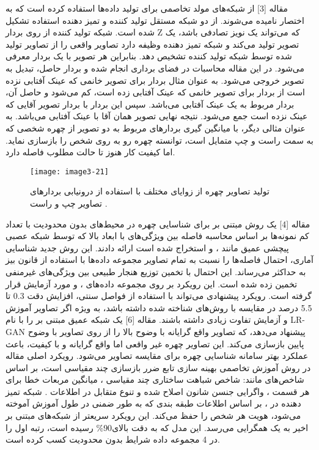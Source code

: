 مقاله [3] از شبکه‌های مولد تخاصمی برای تولید داده‌ها استفاده کرده است که به اختصار  نامیده می‌شوند.  از دو شبکه مستقل تولید کننده و تمیز دهنده استفاده تشکیل شده است. شبکه تولید کننده از روی بردار Z که می‌تواند یک نویز تصادفی باشد، یک تصویر تولید می‌کند و شبکه تمیز دهنده وظیفه دارد تصاویر واقعی را از تصاویر تولید شده توسط شبکه تولید کننده تشخیص دهد. بنابراین هر تصویر با یک بردار  معرفی می‌شود. در این مقاله محاسبات در فضای برداری انجام شده و بردار حاصل، تبدیل به تصویر خروجی می‌شود. به عنوان مثال بردار  برای تصویر خانمی که عینک آفتابی نزده است از بردار  برای تصویر خانمی که عینک آفتابی زده است، کم می‌شود و حاصل آن، بردار مربوط به یک عینک آفتابی می‌باشد. سپس این بردار با بردار تصویر آقایی که عینک نزده است جمع می‌شود. نتیجه نهایی تصویر همان آقا با عینک آفتابی می‌باشد. به عنوان مثالی دیگر، با میانگین گیری بردارهای مربوط به دو تصویر از چهره شخصی که به سمت راست و چپ متمایل است، توانسته چهره رو به روی شخص را بازسازی نماید. اما کیفیت کار هنوز تا حالت مطلوب فاصله دارد.
 \begin{figure}[h]
\centering
  \texttt{[image: image3-21]}
  \caption{تولید تصاویر چهره از زوایای مختلف با استفاده از درونیابی بردارهای تصاویر چپ و راست \cite{ref1}.}
  \label{image3-21}
\end{figure}
\noindent
مقاله [4] یک روش مبتنی بر  برای شناسایی چهره در محیط‌های بدون محدودیت با تعداد کم نمونه‌ها بر اساس محاسبه فاصله بین ویژگی‌های با ابعاد بالا که توسط شبکه عصبی پیچشی عمیق مانند
،
و
استخراج شده است ارائه دادند. این روش جدید شناسایی آماری، احتمال فاصله‌ها را نسبت به تمام تصاویر مجموعه داده‌ها با استفاده از قانون بیز  به حداکثر می‌رساند. این احتمال با تخمین توزیع هنجار طبیعی  بین ویژگی‌های غیرمنفی تخمین زده شده است. این رویکرد بر روی مجموعه داده‌های
،
و
 مورد آزمایش قرار گرفته است. رویکرد پیشنهادی می‌تواند با استفاده از فواصل سنتی، افزایش دقت 0.3 تا 5.5 درصد در مقایسه با روش‌های شناخته شده داشته باشد، به ویژه اگر تصاویر آموزش و آزمایش تفاوت زیادی داشته باشند. 
\noindent
مقاله [6] یک شبکه عمیق مبتنی بر  را با نام LR-GAN پیشنهاد می‌دهد، که تصاویر واقع گرایانه با وضوح بالا را از روی تصاویر با وضوح پایین بازسازی می‌کند. این تصاویر چهره غیر واقعی اما واقع گرایانه و با کیفیت، باعث عملکرد بهتر سامانه شناسایی چهره برای مقایسه تصاویر می‌شود. رویکرد اصلی مقاله در روش آموزش تخاصمی  بهینه سازی تابع ضرر بازسازی چند مقیاسی  است، بر اساس شاخص‌های مانند: شاخص شباهت ساختاری چند مقیاسی ، میانگین مربعات خطا برای هر قسمت  ، واگرایی جنسن شانون اصلاح شده   و تنوع متقابل در اطلاعات . 
شبکه تمیز دهنده در ، بر اساس اطلاعات طبقه‌ بندی که به طور ضمنی در طول آموزش آموخته می‌شود، هویت هر شخص را حفظ می‌کند. این رویکرد سریعتر از شبکه‌های مبتنی بر  اخیر به یک همگرایی می‌رسد. این مدل که به دقت بالای90\% رسیده است، رتبه اول را در 4 مجموعه داده شرایط بدون محدودیت کسب کرده است.

